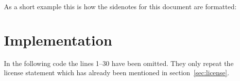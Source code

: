 \documentclass[toc=index,toc=bib,mpinclude]{cnpkgdoc}
\begin{document}
As a short example this is how the sidenotes for this document are formatted:
\begin{beispiel}
\end{beispiel}

\setlength{\linewidth}{\dimexpr\textwidth+.5\marginparwidth}
\printbibliography

\section{Implementation}
In the following code the lines 1--30 have been omitted. They only repeat the
license statement which has already been mentioned in section~\ref{sec:license}.

\implementation[linerange={31-179},firstnumber=31]

\normalsize
\printindex
\end{document}
